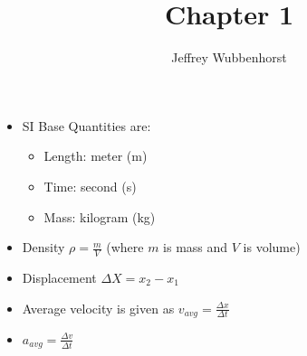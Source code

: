 \documentclass[12pt,letterpaper]{article}
\author{Jeffrey Wubbenhorst}
\title{Chapter 1}
\begin{document}
\maketitle

\begin{itemize}
\item 

SI Base Quantities are: 

\begin{itemize}
\item Length: meter (m) 
\item Time: second (s) 
\item Mass: kilogram (kg) 

\end{itemize}

\item Density $\rho=\frac{m}{V}$ (where $m$ is mass and $V$ is volume)


\item Displacement $\Delta X=x_2-x_1$
\item Average velocity is given as $v_{avg}=\frac{\Delta x}{\Delta t}$

\item $a_{avg}=\frac{\Delta v}{\Delta t}$
\iffalse 
The following five equations describe the motion of a particle with constant acceleration, and don't work anywhere else: 
\begin{itemize}

\item $v=v_0+at$ 
\item $x-x_0=v_0t+\frac{1}{2}at^2$ 
\item $v^2=v_0^2+2a(x-x_0)$ 
\item $x-x_0=\frac{1}{2}(v_0+v)t$ 
\item $x-x_0=vt-\frac{1}{2}at^2$

\end{itemize}

\item For a particle in free flight (for which we assume no air resistance) there is a constant downward acceleration with a magnitude $g$ that we take to be $9.8 m/s^2$. 

\fi 


\end{itemize}
\end{document}
